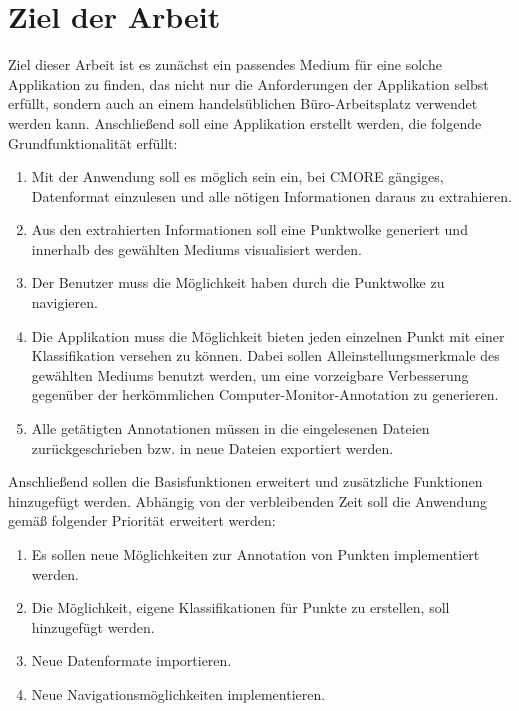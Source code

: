 \section{Ziel der Arbeit}
\label{sec:Goal}
Ziel dieser Arbeit ist es zunächst ein passendes Medium für eine solche Applikation zu finden, das nicht nur die Anforderungen der Applikation selbst erfüllt, sondern auch an einem handelsüblichen Büro-Arbeitsplatz verwendet werden kann. Anschließend soll eine Applikation erstellt werden, die folgende Grundfunktionalität erfüllt:\\

\begin{enumerate}
\item Mit der Anwendung soll es möglich sein ein, bei CMORE gängiges, Datenformat einzulesen und alle nötigen Informationen daraus zu extrahieren.

\item Aus den extrahierten Informationen soll eine Punktwolke generiert und innerhalb des gewählten Mediums visualisiert werden.

\item Der Benutzer muss die Möglichkeit haben durch die Punktwolke zu navigieren.

\item Die Applikation muss die Möglichkeit bieten jeden einzelnen Punkt mit einer Klassifikation versehen zu können. Dabei sollen Alleinstellungsmerkmale des gewählten Mediums benutzt werden, um eine vorzeigbare Verbesserung gegenüber der herkömmlichen Computer-Monitor-Annotation zu generieren. 

\item Alle getätigten Annotationen müssen in die eingelesenen Dateien zurückgeschrieben bzw. in neue Dateien exportiert werden.
\end{enumerate}

Anschließend sollen die Basisfunktionen erweitert und zusätzliche Funktionen hinzugefügt werden. Abhängig von der verbleibenden Zeit soll die Anwendung gemäß folgender Priorität erweitert werden:\\

\begin{enumerate}
\item Es sollen neue Möglichkeiten zur Annotation von Punkten implementiert werden.

\item Die Möglichkeit, eigene Klassifikationen für Punkte zu erstellen, soll hinzugefügt werden.

\item Neue Datenformate importieren.

\item Neue Navigationsmöglichkeiten implementieren.
\end{enumerate}

